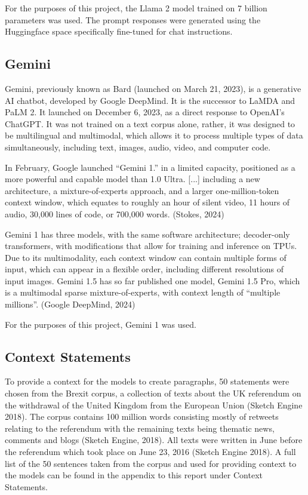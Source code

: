 \documentclass[fleqn,moreauthors,10pt]{ds_report}
\begin{document}
For the purposes of this project, the Llama 2 model trained on 7 billion parameters was used. The prompt responses were generated using the Huggingface space specifically fine-tuned for chat instructions.

\subsection*{Gemini}

Gemini, previously known as Bard (launched on March 21, 2023), is a generative AI chatbot, developed by Google DeepMind. It is the successor to LaMDA and PaLM 2. It launched on December 6, 2023, as a direct response to OpenAI’s ChatGPT. It was not trained on a text corpus alone, rather, it was designed to be multilingual and multimodal, which allows it to process multiple types of data simultaneously, including text, images, audio, video, and computer code.

In February, Google launched “Gemini 1.” in a limited capacity, positioned as a more powerful and capable model than 1.0 Ultra. [...] including a new architecture, a mixture-of-experts approach, and a larger one-million-token context window, which equates to roughly an hour of silent video, 11 hours of audio, 30,000 lines of code, or 700,000 words. (Stokes, 2024)

Gemini 1 has three models, with the same software architecture; decoder-only transformers, with modifications that allow for training and inference on TPUs. Due to its multimodality, each context window can contain multiple forms of input, which can appear in a flexible order, including different resolutions of input images. Gemini 1.5 has so far published one model, Gemini 1.5 Pro, which is a multimodal sparse mixture-of-experts, with context length of “multiple millions”. (Google DeepMind, 2024)

For the purposes of this project, Gemini 1 was used.

\subsection*{Context Statements}

To provide a context for the models to create paragraphs, 50 statements were chosen from the Brexit corpus, a collection of texts about the UK referendum on the withdrawal of the United Kingdom from the European Union (Sketch Engine 2018). The corpus contains 100 million words consisting mostly of retweets relating to the referendum with the remaining texts being thematic news, comments and blogs (Sketch Engine, 2018). All texts were written in June before the referendum which took place on June 23, 2016 (Sketch Engine 2018). A full list of the 50 sentences taken from the corpus and used for providing context to the models can be found in the appendix to this report under Context Statements.
\end{document}
